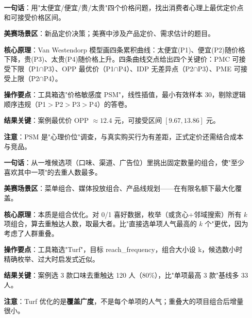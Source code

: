 
\begin{algobrief}
\textbf{一句话}：用"太便宜/便宜/贵/太贵"四个价格问题，找出消费者心理上最优定价点和可接受价格区间。

\textbf{美赛场景区}：新品定价决策；美赛中涉及产品定价、需求估计的题目。

\textbf{核心原理}：Van Westendorp 模型画四条累积曲线：太便宜(P1)、便宜(P2)随价格下降，贵(P3)、太贵(P4)随价格上升。四条曲线交点给出四个关键价：PMC 可接受下限（P1$\cap$P3）、OPP 最优价（P1$\cap$P4）、IDP 无差异点（P2$\cap$P3）、PME 可接受上限（P2$\cap$P4）。

\textbf{操作要点}：工具箱选"价格敏感度 PSM"，线性插值，最小有效样本 30，剔除逻辑顺序违规（P1$>$P2$>$P3$>$P4）的答卷。

\textbf{结果关键}：案例最优价 OPP $\approx 12.4$ 元，可接受区间 $[9.67, 13.86]$ 元。

\textbf{注意}：PSM 是"心理价位"调查，与真实购买行为有差距，正式定价还需结合成本与竞品。
\end{algobrief}


\begin{algobrief}
\textbf{一句话}：从一堆候选项（口味、渠道、广告位）里挑出固定数量的组合，使"至少喜欢其中一项"的去重人数最多。

\textbf{美赛场景区}：菜单组合、媒体投放组合、产品线规划——在有限名额下最大化覆盖。

\textbf{核心原理}：本质是组合优化。对 0/1 喜好数据，枚举（或贪心+邻域搜索）所有 $k$ 项组合，算去重触达人数，取最大者。比"直接选单项人气最高的 $k$ 个"更优，因为考虑了人群重叠。

\textbf{操作要点}：工具箱选"Turf"，目标 reach\_frequency，组合大小设 k，候选数小时精确枚举、过大时启发式近似。

\textbf{结果关键}：案例选 3 款口味去重触达 120 人（80\%），比"单项最高 3 款"基线多 33 人。

\textbf{注意}：Turf 优化的是\textbf{覆盖广度}，不是每个单项的人气；重叠大的项目组合后增量很小。
\end{algobrief}


